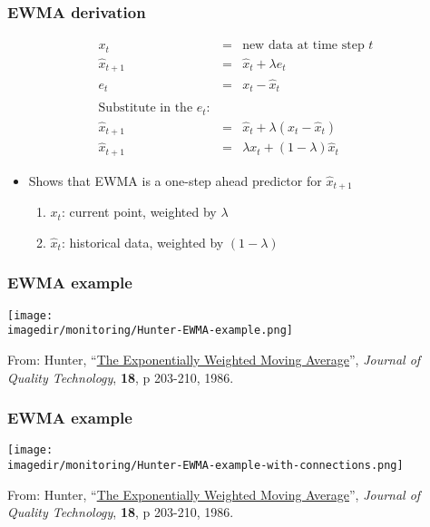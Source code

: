 \begin{frame}\frametitle{EWMA derivation}

	$$
	\begin{array}{rcl}
		x_t &=& \text{new data at time step } t\\
		\hat{x}_{t+1} &=& \hat{x}_{t} + \lambda e_{t} \\
		e_t &=& x_t - \hat{x}_t \\
		\\
		\text{Substitute in the}\,\, e_t:\\		
		\hat{x}_{t+1} &=& \hat{x}_{t} + \lambda \left(x_t - \hat{x}_t\right) \\
		\hat{x}_{t+1} &=& \lambda x_t + \left(1-\lambda \right)\hat{x}_{t}
	\end{array}
	$$
	
	\vspace{12pt}
	\begin{itemize}
		\item	Shows that EWMA is a one-step ahead predictor for $\hat{x}_{t+1}$
		\begin{enumerate}
			\item	$x_t$: current point, weighted by $\lambda$
			\item	$\hat{x}_{t}$: historical data, weighted by $\left(1-\lambda \right)$
		\end{enumerate}
	\end{itemize}
\end{frame}

\begin{frame}\frametitle{EWMA example}
	\begin{center}
		\texttt{[image: \\imagedir/monitoring/Hunter-EWMA-example.png]}
	\end{center}
	\vspace{6pt}
	From: Hunter, ``\href{http://literature.connectmv.com/item/175/the-exponentially-weighted-moving-average}{The Exponentially Weighted Moving Average}'', \emph{Journal of Quality Technology}, \textbf{18}, p 203-210, 1986.
\end{frame}

\begin{frame}\frametitle{EWMA example}
	\begin{center}
		\texttt{[image: \\imagedir/monitoring/Hunter-EWMA-example-with-connections.png]}
	\end{center}
	\vspace{6pt}
	From: Hunter, ``\href{http://literature.connectmv.com/item/175/the-exponentially-weighted-moving-average}{The Exponentially Weighted Moving Average}'', \emph{Journal of Quality Technology}, \textbf{18}, p 203-210, 1986.
\end{frame}

